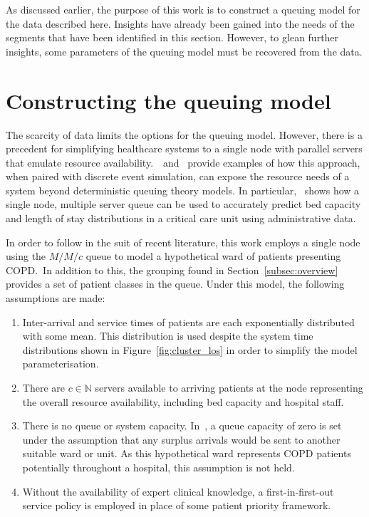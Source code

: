 \documentclass[11pt]{article}
\begin{document}
As discussed earlier, the purpose of this work is to construct a queuing model
for the data described here. Insights have already been gained into the needs of
the segments that have been identified in this section. However, to glean
further insights, some parameters of the queuing model must be recovered from
the data.

\section{Constructing the queuing model}\label{sec:model}

The scarcity of data limits the options for the queuing model. However, there is
a precedent for simplifying healthcare systems to a single node with parallel
servers that emulate resource
availability.~\cite{Steins2013}~and~\cite{Williams2015} provide examples of
how this approach, when paired with discrete event simulation, can expose the
resource needs of a system beyond deterministic queuing theory models. In
particular,~\cite{Williams2015} shows how a single node, multiple server queue
can be used to accurately predict bed capacity and length of stay distributions
in a critical care unit using administrative data.

In order to follow in the suit of recent literature, this work employs a single
node using the \(M/M/c\) queue to model a hypothetical ward of patients
presenting COPD.\ In addition to this, the grouping found in
Section~\ref{subsec:overview} provides a set of patient classes in the queue.
Under this model, the following assumptions are made:
\begin{enumerate}
    \item Inter-arrival and service times of patients are each exponentially
        distributed with some mean. This distribution is used despite the system
        time distributions shown in Figure~\ref{fig:cluster_los} in order to
        simplify the model parameterisation.
    \item There are \(c \in \mathbb{N}\) servers available to arriving patients
        at the node representing the overall resource availability, including
        bed capacity and hospital staff.
    \item There is no queue or system capacity. In~\cite{Williams2015}, a
        queue capacity of zero is set under the assumption that any surplus
        arrivals would be sent to another suitable ward or unit. As this
        hypothetical ward represents COPD patients potentially throughout a
        hospital, this assumption is not held.
    \item Without the availability of expert clinical knowledge, a
        first-in-first-out service policy is employed in place of some patient
        priority framework.
\end{enumerate}
\end{document}
